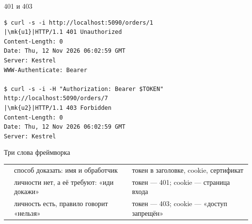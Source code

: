 \documentclass[aspectratio=169,10pt,t]{beamer}
\newcommand{\termsm}{\ttfamily\fontsize{6.6}{7.9}\selectfont}
\newcommand{\mk}[1]{\tikz[remember picture,overlay]\coordinate (#1) at (0,0.55ex);}
\begin{document}
\begin{frame}[fragile]{401 и 403}
  \slidetop

\begin{lstlisting}[style=term,basicstyle=\termsm,escapechar=|]
$ curl -s -i http://localhost:5090/orders/1
|\mk{u1}|HTTP/1.1 401 Unauthorized
Content-Length: 0
Date: Thu, 12 Nov 2026 06:02:59 GMT
Server: Kestrel
WWW-Authenticate: Bearer

$ curl -s -i -H "Authorization: Bearer $TOKEN" http://localhost:5090/orders/7
|\mk{u2}|HTTP/1.1 403 Forbidden
Content-Length: 0
Date: Thu, 12 Nov 2026 06:02:59 GMT
Server: Kestrel
\end{lstlisting}

\end{frame}

\begin{frame}{Три слова фреймворка}
  \slidetop
  {\renewcommand{\arraystretch}{1.6}
  \begin{tabular}{@{}L{3.0cm}L{4.6cm}L{5.2cm}@{}}
         & способ доказать: имя и обработчик & токен в заголовке,
      cookie, сертификат \\
     & личности нет, а её требуют: «иди докажи» & токен --- 401;
      cookie --- страница входа \\
        & личность есть, правило говорит «нельзя» & токен --- 403;
      cookie --- «доступ запрещён» \\
  \end{tabular}}

  \slidegap
\end{frame}
\end{document}

